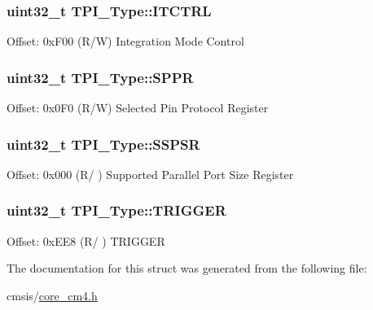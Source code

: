 \subsubsection[{\texorpdfstring{I\+T\+C\+T\+RL}{ITCTRL}}]{ uint32\+\_\+t T\+P\+I\+\_\+\+Type\+::\+I\+T\+C\+T\+RL}\hypertarget{struct_t_p_i___type_ab49c2cb6b5fe082746a444e07548c198}{}\label{struct_t_p_i___type_ab49c2cb6b5fe082746a444e07548c198}
Offset\+: 0x\+F00 (R/W) Integration Mode Control 
\subsubsection[{\texorpdfstring{S\+P\+PR}{SPPR}}]{ uint32\+\_\+t T\+P\+I\+\_\+\+Type\+::\+S\+P\+PR}\hypertarget{struct_t_p_i___type_a3eb655f2e45d7af358775025c1a50c8e}{}\label{struct_t_p_i___type_a3eb655f2e45d7af358775025c1a50c8e}
Offset\+: 0x0\+F0 (R/W) Selected Pin Protocol Register 
\subsubsection[{\texorpdfstring{S\+S\+P\+SR}{SSPSR}}]{ uint32\+\_\+t T\+P\+I\+\_\+\+Type\+::\+S\+S\+P\+SR}\hypertarget{struct_t_p_i___type_a158e9d784f6ee6398f4bdcb2e4ca0912}{}\label{struct_t_p_i___type_a158e9d784f6ee6398f4bdcb2e4ca0912}
Offset\+: 0x000 (R/ ) Supported Parallel Port Size Register 
\subsubsection[{\texorpdfstring{T\+R\+I\+G\+G\+ER}{TRIGGER}}]{ uint32\+\_\+t T\+P\+I\+\_\+\+Type\+::\+T\+R\+I\+G\+G\+ER}\hypertarget{struct_t_p_i___type_aa4b603c71768dbda553da571eccba1fe}{}\label{struct_t_p_i___type_aa4b603c71768dbda553da571eccba1fe}
Offset\+: 0x\+E\+E8 (R/ ) T\+R\+I\+G\+G\+ER 

The documentation for this struct was generated from the following file\+:\begin{DoxyCompactItemize}
\item 
cmsis/\hyperlink{core__cm4_8h}{core\+\_\+cm4.\+h}\end{DoxyCompactItemize}
